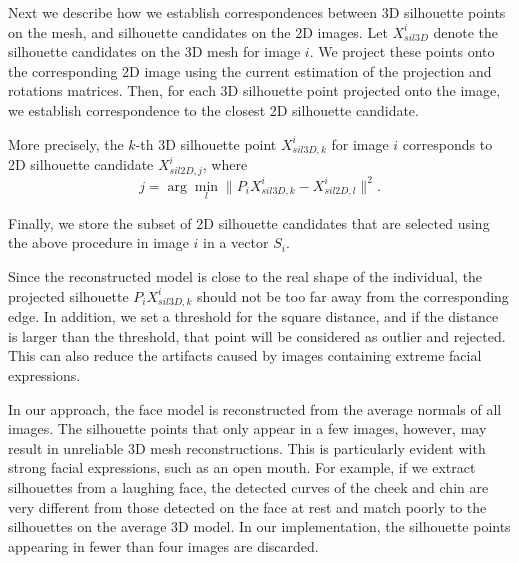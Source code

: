Next we describe how we establish correspondences between 3D silhouette points on the mesh, and silhouette candidates on the 2D images. Let $X_{sil3D}^i$ denote the silhouette candidates on the 3D mesh for image $i$. We project these points onto the corresponding 2D image using the current estimation of the projection and rotations matrices. Then, for each 3D silhouette point projected onto the image, we establish correspondence to the closest 2D silhouette candidate.

More precisely, the $k$-th 3D silhouette point $X_{sil3D,k}^{i}$ for image $i$ corresponds to 2D silhouette candidate $X_{sil2D,j}^i$, where 
%
\begin{equation}
j = \arg{\min}_{l} \|P_{i} X_{sil3D,k}^{i} - X_{sil2D,l}^{i}\|^2.
\end{equation} 
%

Finally, we store the subset of 2D silhouette candidates that are selected using the above procedure in image $i$ in a vector $S_i$.

Since the reconstructed model is close to the real shape of the individual, the projected silhouette $P_i X_{sil3D,k}^{i}$ should not be too far away from the corresponding edge. In addition, we set a threshold for the square distance, and if the distance is larger than the threshold, that point will be considered as outlier and rejected. This can also reduce the artifacts caused by images containing extreme facial expressions.



In our approach, the face model is reconstructed from the average normals of all images. The silhouette points that only appear in a few images, however, may result in unreliable 3D mesh reconstructions. This is particularly evident with strong facial expressions, such as an open mouth. For example, if we extract silhouettes from a laughing face, the detected curves of the cheek and chin are very different from those detected on the face at rest and match poorly to the silhouettes on the average 3D model. %
In our implementation, the silhouette points appearing in fewer than four images are discarded.


